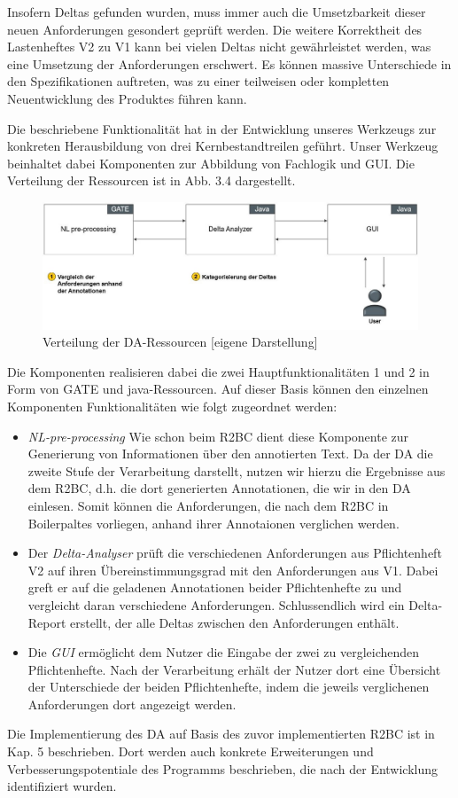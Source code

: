 \documentclass[12pt]{report}
\begin{document}
Insofern Deltas gefunden wurden, muss immer auch die Umsetzbarkeit dieser neuen Anforderungen gesondert geprüft werden. Die weitere Korrektheit des Lastenheftes V2 zu V1 kann bei vielen Deltas nicht gewährleistet werden, was eine Umsetzung der Anforderungen erschwert. Es können massive Unterschiede in den Spezifikationen auftreten, was zu einer teilweisen oder kompletten Neuentwicklung des Produktes führen kann.

Die beschriebene Funktionalität hat in der Entwicklung unseres Werkzeugs zur konkreten Herausbildung von drei Kernbestandtreilen geführt. Unser Werkzeug beinhaltet dabei Komponenten zur Abbildung von Fachlogik und GUI. Die Verteilung der Ressourcen ist in Abb. 3.4 dargestellt. 
\begin{figure}[h!]
\begin{center}
\includegraphics[scale=0.6]{Bilder/Verteilung-DA.jpg}
\caption{Verteilung der DA-Ressourcen [eigene Darstellung]}
\end{center}
\end{figure}
Die Komponenten realisieren dabei die zwei Hauptfunktionalitäten 1 und 2 in Form von GATE und java-Ressourcen. Auf dieser Basis können den einzelnen Komponenten Funktionalitäten wie folgt zugeordnet werden:
\begin{itemize}
\item \textit{NL-pre-processing} Wie schon beim R2BC dient diese Komponente zur Generierung von Informationen über den annotierten Text. Da der DA die zweite Stufe der Verarbeitung darstellt, nutzen wir hierzu die Ergebnisse aus dem R2BC, d.h. die dort generierten Annotationen, die wir in den DA einlesen. Somit können die Anforderungen, die nach dem R2BC in Boilerpaltes vorliegen, anhand ihrer Annotaionen verglichen werden.
\item Der \textit{Delta-Analyser} prüft die verschiedenen Anforderungen aus Pflichtenheft V2 auf ihren Übereinstimmungsgrad mit den Anforderungen aus V1. Dabei greft er auf die geladenen Annotationen beider Pflichtenhefte zu und vergleicht daran verschiedene Anforderungen. Schlussendlich wird ein Delta-Report erstellt, der alle Deltas zwischen den Anforderungen enthält.
\item Die \textit{GUI} ermöglicht dem Nutzer die Eingabe der zwei zu vergleichenden Pflichtenhefte. Nach der Verarbeitung erhält der Nutzer dort eine Übersicht der Unterschiede der beiden Pflichtenhefte, indem die jeweils verglichenen Anforderungen dort angezeigt werden.
\end{itemize}
Die Implementierung des DA auf Basis des zuvor implementierten R2BC ist in Kap. 5 beschrieben. Dort werden auch konkrete Erweiterungen und Verbesserungspotentiale des Programms beschrieben, die nach der Entwicklung identifiziert wurden.
\end{document}
